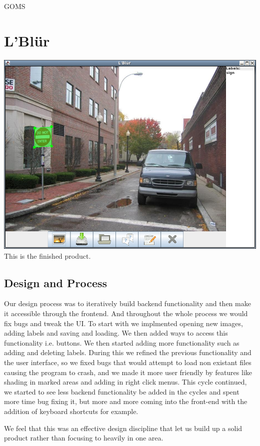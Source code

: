 \documentclass[a4paper,11pt,oneside]{article}
\begin{document}
GOMS

\section{L'Bl\"{u}r}

\includegraphics[width=\textwidth]{final.png}
This is the finished product.

\subsection{Design and Process}
Our design process was to iteratively build backend functionality and then make
it accessible through the frontend.  And throughout the whole process we would
fix bugs and tweak the UI.  To start with we implmented opening new images,
adding labels and saving and loading.  We then added ways to access this
functionality i.e. buttons.  We then started adding more functionality such as
adding and deleting labels.  During this we refined the previous functionality
and the user interface, so we fixed bugs that would attempt to load non existant
files causing the program to crash, and we made it more user friendly by
features like shading in marked areas and adding in right click menus.  This
cycle continued, we started to see less backend functionality be added in the
cycles and spent more time bug fixing it, but more and more coming into the
front-end with the addition of keyboard shortcuts for example.

We feel that this was an effective design discipline that let us build up a
solid product rather than focusing to heavily in one area.
\end{document}
